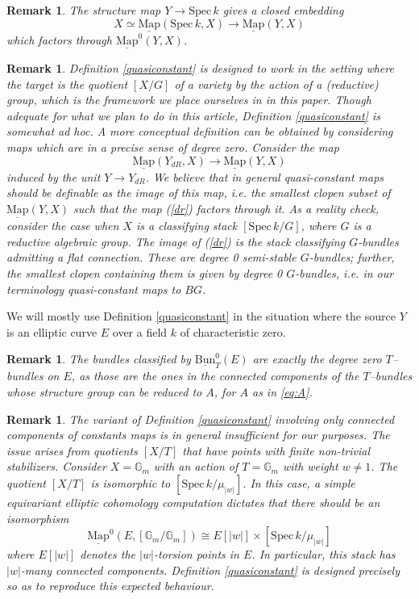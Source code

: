 \documentclass[11pt,letterpaper]{amsart}
\newtheorem{remark}[dummy]{Remark}
\newcommand{\bG}{\mathbb{G}}
\newcommand{\Map}[2]{\underline{\mathrm{Map}}\left (#1,#2\right )}
\newcommand{\Mapo}[2]{\underline{\mathrm{Map}}^{0}\left (#1,#2\right )}
\newcommand{\Spec}{\mathrm{S}\mathrm{pec}\,}
\newcommand{\Bun}{\underline{\mathrm{Bun}}}
\begin{document}
\begin{remark}
The structure map $Y \to \Spec k$ gives a closed embedding 
$$
X \simeq \Map{\Spec k}{X} \to \Map{Y}{X}
$$
which factors through $\Mapo{Y}{X}$. 
\end{remark}  
\begin{remark}
Definition \ref{quasiconstant} is designed to work in the setting where the target is the quotient   $[X/G]$ of a variety by the action of a (reductive) group, which is the framework we place ourselves in in this paper. Though adequate for what we plan to do in this article, Definition \ref{quasiconstant} is somewhat ad hoc. A more conceptual definition can be obtained by considering maps which are in a precise sense \emph{of degree zero}. Consider the map
\begin{equation}
\label{dr}
\Map{Y_{dR}}{X}\to \Map{Y}{X}
\end{equation}
induced by the unit $Y\to Y_{dR}$.
We believe that in general quasi-constant maps should be definable as the image of this map, i.e. the smallest clopen subset of $\Map{Y}{X}$ such that the map (\ref{dr}) factors through it. 
As a reality check, consider the case when $X$ is a classifying stack $[\Spec k/G]$, where $G$ is a reductive algebraic group. The image of (\ref{dr}) is the stack classifying $G$-bundles admitting a flat connection. These are degree 0 semi-stable $G$-bundles; further, the smallest clopen containing them is given by degree 0 $G$-bundles, i.e. in our terminology quasi-constant maps to $BG$.   
\end{remark}
We will mostly use Definition \ref{quasiconstant} in the situation where the source $Y$ is an elliptic curve $E$ over a field $k$ of characteristic zero. 
\begin{remark}
The bundles classified by $\Bun^0_T(E)$ are exactly the degree zero $T$--bundles on $E$, as those are the ones in the connected components of the $T$--bundles whose structure group can be reduced to $A$, for $A$ as in \eqref{eq:A}.
\end{remark}
\begin{remark}
The variant of Definition \ref{quasiconstant} involving only connected components of constants maps is in general insufficient for our purposes. The issue arises from quotients $[X/T]$ that have points with finite non-trivial stabilizers.
Consider $X=\bG_m$ with an action of $T=\bG_m$ with weight $w\neq 1$. The quotient $[X/T]$ is isomorphic to $[\Spec k/\mu_{|w|}]$. In this case, a simple  equivariant elliptic cohomology computation dictates that there should be an isomorphism  
$$
\Mapo{E}{[\mathbb{G}_m/\mathbb{G}_m]} \cong E[|w|] \times [\Spec k/\mu_{|w|}]
$$
where $E[|w|]$ denotes the $|w|$-torsion points in $E$. In particular, this stack has $|w|$-many connected components.  
Definition \ref{quasiconstant} is designed precisely so as to reproduce this expected behaviour. 
\end{remark}
\end{document}
